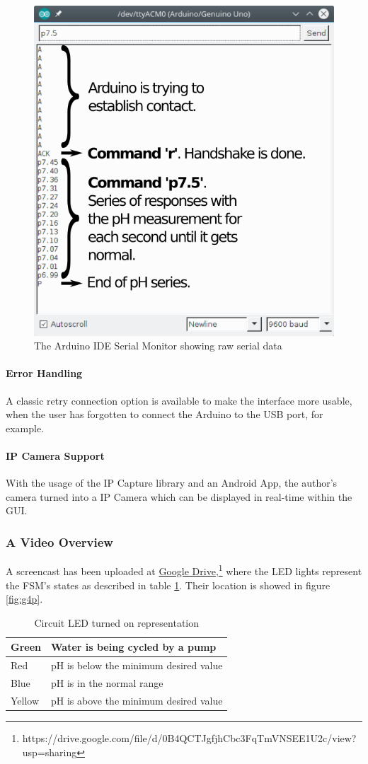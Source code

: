 \begin{figure}[h!]
    \centering
    \includegraphics[width=.4\textwidth]{img/serialMon.png}
    \caption{The Arduino IDE Serial Monitor showing raw serial data}
    \label{fig:serialMonitor}
\end{figure}

\paragraph{Error Handling}

A classic retry connection option is available to make the interface more usable,
when the user has forgotten to connect the Arduino to the USB port,
for example.

\paragraph{IP Camera Support}
With the usage of the IP Capture library \cite{ipcapture_2016} and an Android App,
the author's camera turned into a IP Camera which can be displayed in real-time within the GUI.


\subsubsection{A Video Overview}
\label{sec:video}
A screencast has been uploaded at \href{https://drive.google.com/file/d/0B4QCTJgfjhCbc3FqTmVNSEE1U2c/view?usp=sharing}{Google Drive},\footnote{https://drive.google.com/file/d/0B4QCTJgfjhCbc3FqTmVNSEE1U2c/view?usp=sharing}
where the LED lights represent the FSM's states as described in table \ref{tab:leds}.
Their location is showed in figure \ref{fig:g4p}.

\begin{table}
    \centering
    \caption{Circuit LED turned on representation}
    \label{tab:leds}

    \begin{tabular}[h]{|l|l|}
        \hline
        Green   & Water is being cycled by a pump
        \\\hline
        Red     & pH is below the minimum desired value
        \\\hline
        Blue    & pH is in the normal range
        \\\hline
        Yellow  & pH is above the minimum desired value
        \\\hline

    \end{tabular}
\end{table}

